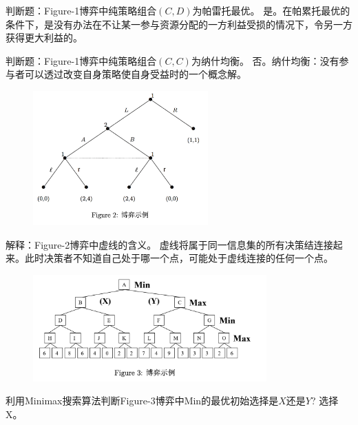 \begin{problem}
	判断题：Figure-1博弈中纯策略组合$(C,D)$为帕雷托最优。
	\solution 是。在帕累托最优的条件下，是没有办法在不让某一参与资源分配的一方利益受损的情况下，令另一方获得更大利益的。
\end{problem}

\begin{problem}
	判断题：Figure-1博弈中纯策略组合$(C,C)$为纳什均衡。
	\solution 否。纳什均衡：没有参与者可以透过改变自身策略使自身受益时的一个概念解。
\end{problem}

\begin{figure}[htbp]
	\centering\label{fig:2}
	\includegraphics[width=0.6\textwidth]{./figure/fig2.png}
\end{figure}

\begin{problem}
	解释：Figure-2博弈中虚线的含义。
	\solution 虚线将属于同一信息集的所有决策结连接起来。此时决策者不知道自己处于哪一个点，可能处于虚线连接的任何一个点。
\end{problem}

\begin{figure}[htbp]
	\centering\label{fig:3}
	\includegraphics[width=0.8\textwidth]{./figure/fig3.png}
\end{figure}

\begin{problem}
	利用Minimax搜索算法判断Figure-3博弈中Min的最优初始选择是$X$还是$Y$?
	\solution 选择X。
\end{problem}

